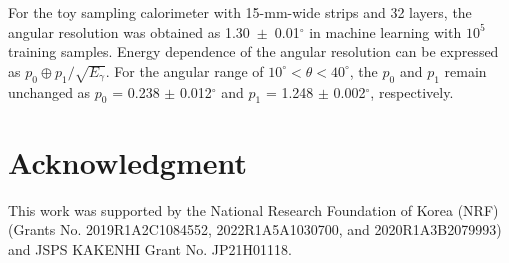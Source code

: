 \documentclass[12pt,times,draftclsnofoot,a4paper]{elsarticle}
\begin{document}
For the toy sampling calorimeter with 15-mm-wide strips and 32 layers, the angular resolution was obtained as 1.30~$\pm$~0.01$^{\circ}$ in machine learning with $10^{5}$ training samples. Energy dependence of the angular resolution can be expressed as $p_{0} \oplus p_{1}/\sqrt{E_{\gamma}}$. For the angular range of $10^{\circ}<\theta<40^{\circ}$, the $p_{0}$ and $p_{1}$ remain unchanged as $p_{0}$ = 0.238 $\pm$ 0.012$^{\circ}$ and $p_{1}$ = 1.248 $\pm$ 0.002$^{\circ}$, respectively.

\label{sec:con}


\section*{Acknowledgment}
This work was supported by the National Research Foundation of Korea (NRF) 
(Grants No. 2019R1A2C1084552, 2022R1A5A1030700, and 2020R1A3B2079993) and JSPS KAKENHI Grant No. JP21H01118.
\end{document}
